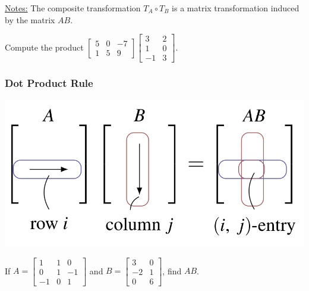 \documentclass[20pt,a4paper]{extarticle}
\newcounter{example}[section]
\begin{document}
\underline{Notes:} The composite transformation $T_A \circ T_B$ is a matrix transformation induced by the matrix $AB$.

\begin{example}
Compute the product $\begin{bmatrix} 5 & 0 & -7 \\ 1 & 5 & 9 \end{bmatrix} \begin{bmatrix} 3 & 2\\ 1 & 0 \\ -1 & 3 \end{bmatrix}$.
\end{example}

\begin{solution}

\end{solution}

\newpage 

\subsubsection{Dot Product Rule}



\begin{center}
\includegraphics[scale=0.45]{DotProductRuleMatrixProduct.png}
\end{center}

\begin{example}
If $A = \begin{bmatrix} 1 & 1 & 0 \\ 0 & 1 & -1 \\ -1 & 0 & 1 \end{bmatrix}$ and $B = \begin{bmatrix} 3 & 0 \\ -2 & 1 \\ 0 & 6 \end{bmatrix}$, find $AB$.
\end{example}
\end{document}
